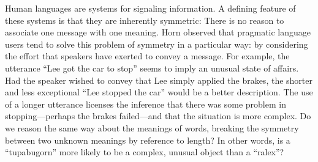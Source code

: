\documentclass[12pt]{article}
\begin{document}
Human languages are systems for signaling information. A defining feature of these systems is that they are inherently symmetric: There is no reason to associate one  message with one meaning. Horn\cite{horn1984} observed that pragmatic language users tend to solve this problem of symmetry in a particular way: by considering the effort that speakers have exerted to convey a message.  For example, the utterance ``Lee got the car to stop'' seems to imply an unusual state of affairs. Had the speaker wished to convey that Lee simply applied the brakes, the shorter and less exceptional ``Lee stopped the car'' would be a better description. The use of a longer utterance licenses the inference that there was some problem in stopping---perhaps the brakes failed---and that the situation is more complex. Do we reason the same way about the meanings of words, breaking the symmetry between two unknown meanings by reference to length? In other words, is a ``tupabugorn'' more likely to be a complex, unusual object than a ``ralex''? 
\end{document}
